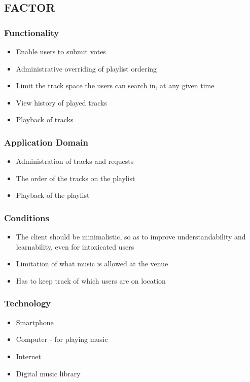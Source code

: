 \subsection{FACTOR}
\subsubsection{Functionality}
\begin{itemize}
  \item Enable users to submit votes
  \item Administrative overriding of playlist ordering
  \item Limit the track space the users can search in, at any given time
  \item View history of played tracks
  \item Playback of tracks
\end{itemize}

\subsubsection{Application Domain}
\begin{itemize}
  \item Administration of tracks and requests
  \item The order of the tracks on the playlist
  \item Playback of the playlist
\end{itemize}

\subsubsection{Conditions}
\begin{itemize}
  \item The client should be minimalistic, so as to improve understandability and learnability, even for intoxicated users
  \item Limitation of what music is allowed at the venue
  \item Has to keep track of which users are on location
\end{itemize}

\subsubsection{Technology}
\begin{itemize}
  \item Smartphone
  \item Computer - for playing music
  \item Internet
  \item Digital music library
\end{itemize}

